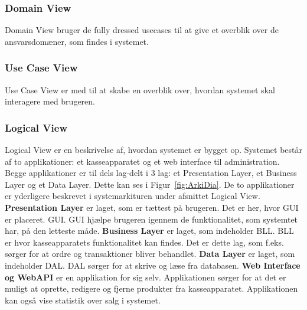 \subsubsection{Domain View}
Domain View bruger de fully dressed \gls{usecase}s til at give et overblik over de ansvarsdomæner, som findes i systemet.

\subsubsection{Use Case View}
Use Case View er med til at skabe en overblik over, hvordan \gls{system}et skal interagere med brugeren.

\subsubsection{Logical View}
Logical View er en beskrivelse af, hvordan systemet er bygget op. Systemet består af to applikationer: et kasseapparatet og et web interface til administration. Begge applikationer er til dels lag-delt i 3 lag: et Presentation Layer, et Business Layer og et Data Layer. Dette kan ses i Figur~\ref{fig:ArkiDia}. De to applikationer er yderligere beskrevet i systemarkituren under afsnittet Logical View. 
\newline\newline
\textbf{Presentation Layer} er laget, som er tættest på brugeren. Det er her, hvor \gls{GUI} er placeret. \gls{GUI}. \gls{GUI} hjælpe brugeren igennem de funktionalitet, som systemtet har, på den letteste måde.
\newline\newline
\textbf{Business Layer} er laget, som indeholder \gls{BLL}. \gls{BLL} er hvor kasseapparatets funktionalitet kan findes. Det er dette lag, som f.eks. sørger for at ordre og transaktioner bliver behandlet.
\newline\newline
\textbf{Data Layer} er laget, som indeholder \gls{DAL}. \gls{DAL} sørger for at skrive og læse fra databasen.
\newline\newline
\textbf{Web Interface og WebAPI} er en applikation for sig selv. Applikationen sørger for at det er muligt at oprette, redigere og fjerne produkter fra kasseapparatet. Applikationen kan også vise statistik over salg i systemet. 

